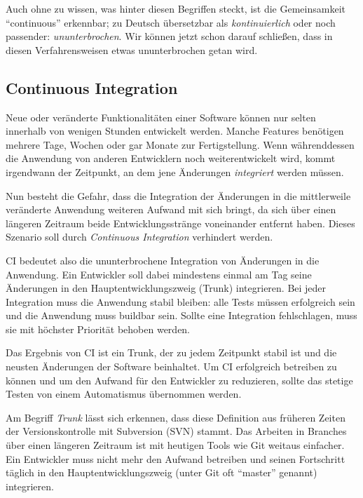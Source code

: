 Auch ohne zu wissen, was hinter diesen Begriffen steckt, ist die Gemeinsamkeit ``continuous'' erkennbar; zu Deutsch übersetzbar als \emph{kontinuierlich} oder noch passender: \emph{ununterbrochen}. Wir können jetzt schon darauf schließen, dass in diesen Verfahrensweisen etwas ununterbrochen getan wird.

\subsection{Continuous Integration}

Neue oder veränderte Funktionalitäten einer Software können nur selten innerhalb von wenigen Stunden entwickelt werden. Manche Features benötigen mehrere Tage, Wochen oder gar Monate zur Fertigstellung. Wenn während\-dessen die Anwendung von anderen Entwicklern noch weiterentwickelt wird, kommt irgendwann der Zeitpunkt, an dem jene Änderungen \emph{integriert} werden müssen.

Nun besteht die Gefahr, dass die Integration der Änderungen in die mittlerweile veränderte Anwendung weiteren Aufwand mit sich bringt, da sich über einen längeren Zeitraum beide Entwicklungsstränge voneinander entfernt haben. Dieses Szenario soll durch \emph{Continuous Integration} verhindert werden.

\ac{CI} bedeutet also die ununterbrochene Integration von Än\-der\-ung\-en in die Anwendung. Ein Entwickler soll dabei mindestens einmal am Tag seine Änderungen in den Hauptentwicklungszweig (Trunk) integrieren. Bei jeder Integration muss die Anwendung stabil bleiben: alle Tests müssen erfolgreich sein und die Anwendung muss buildbar sein. Sollte eine Integration fehlschlagen, muss sie mit höchster Priorität behoben werden. \citep[25ff]{Duvall2007}

Das Ergebnis von \ac{CI} ist ein Trunk, der zu jedem Zeitpunkt stabil ist und die neusten Änderungen der Software beinhaltet. Um \ac{CI} erfolgreich betreiben zu können und um den Aufwand für den Entwickler zu reduzieren, sollte das stetige Testen von einem Automatismus übernommen werden.

Am Begriff \emph{Trunk} lässt sich erkennen, dass diese Definition aus früheren Zeiten der Versionskontrolle mit Subversion (SVN) stammt. Das Arbeiten in Branches über einen längeren Zeitraum ist mit heutigen Tools wie Git weitaus einfacher. Ein Entwickler muss nicht mehr den Aufwand betreiben und seinen Fortschritt täglich in den Hauptentwicklungszweig (unter Git oft ``master'' genannt) integrieren.

